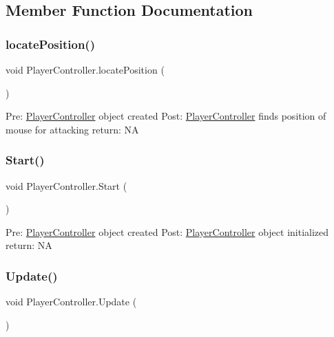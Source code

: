 \subsection{Member Function Documentation}
\mbox{\label{class_player_controller_a0c8df63dcb61c214981ae2622f52ef3e}} 
\subsubsection{\texorpdfstring{locate\+Position()}{locatePosition()}}
{\footnotesize\ttfamily void Player\+Controller.\+locate\+Position (\begin{DoxyParamCaption}{ }\end{DoxyParamCaption})\hspace{0.3cm}{\ttfamily [private]}}

Pre\+: \hyperlink{class_player_controller}{Player\+Controller} object created Post\+: \hyperlink{class_player_controller}{Player\+Controller} finds position of mouse for attacking return\+: NA \mbox{\label{class_player_controller_ae1117d9c4da3193181cddad2c814e467}} 
\subsubsection{\texorpdfstring{Start()}{Start()}}
{\footnotesize\ttfamily void Player\+Controller.\+Start (\begin{DoxyParamCaption}{ }\end{DoxyParamCaption})\hspace{0.3cm}{\ttfamily [private]}}

Pre\+: \hyperlink{class_player_controller}{Player\+Controller} object created Post\+: \hyperlink{class_player_controller}{Player\+Controller} object initialized return\+: NA \mbox{\label{class_player_controller_ae8bc83dffb99867a04be016473ed2c43}} 
\subsubsection{\texorpdfstring{Update()}{Update()}}
{\footnotesize\ttfamily void Player\+Controller.\+Update (\begin{DoxyParamCaption}{ }\end{DoxyParamCaption})\hspace{0.3cm}{\ttfamily [private]}}

